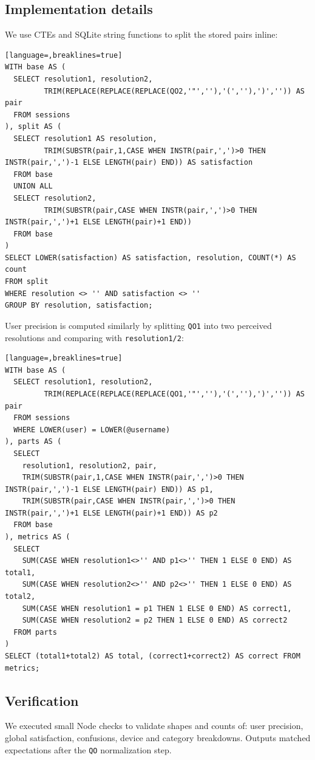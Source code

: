 \documentclass[11pt,a4paper]{article}
\begin{document}
\subsection{Implementation details}
We use CTEs and SQLite string functions to split the stored pairs inline:
\begin{lstlisting}[language=,breaklines=true]
WITH base AS (
  SELECT resolution1, resolution2,
         TRIM(REPLACE(REPLACE(REPLACE(QO2,'"',''),'(',''),')','')) AS pair
  FROM sessions
), split AS (
  SELECT resolution1 AS resolution,
         TRIM(SUBSTR(pair,1,CASE WHEN INSTR(pair,',')>0 THEN INSTR(pair,',')-1 ELSE LENGTH(pair) END)) AS satisfaction
  FROM base
  UNION ALL
  SELECT resolution2,
         TRIM(SUBSTR(pair,CASE WHEN INSTR(pair,',')>0 THEN INSTR(pair,',')+1 ELSE LENGTH(pair)+1 END))
  FROM base
)
SELECT LOWER(satisfaction) AS satisfaction, resolution, COUNT(*) AS count
FROM split
WHERE resolution <> '' AND satisfaction <> ''
GROUP BY resolution, satisfaction;
\end{lstlisting}

User precision is computed similarly by splitting \texttt{QO1} into two perceived resolutions and comparing with \texttt{resolution1/2}:
\begin{lstlisting}[language=,breaklines=true]
WITH base AS (
  SELECT resolution1, resolution2,
         TRIM(REPLACE(REPLACE(REPLACE(QO1,'"',''),'(',''),')','')) AS pair
  FROM sessions
  WHERE LOWER(user) = LOWER(@username)
), parts AS (
  SELECT
    resolution1, resolution2, pair,
    TRIM(SUBSTR(pair,1,CASE WHEN INSTR(pair,',')>0 THEN INSTR(pair,',')-1 ELSE LENGTH(pair) END)) AS p1,
    TRIM(SUBSTR(pair,CASE WHEN INSTR(pair,',')>0 THEN INSTR(pair,',')+1 ELSE LENGTH(pair)+1 END)) AS p2
  FROM base
), metrics AS (
  SELECT
    SUM(CASE WHEN resolution1<>'' AND p1<>'' THEN 1 ELSE 0 END) AS total1,
    SUM(CASE WHEN resolution2<>'' AND p2<>'' THEN 1 ELSE 0 END) AS total2,
    SUM(CASE WHEN resolution1 = p1 THEN 1 ELSE 0 END) AS correct1,
    SUM(CASE WHEN resolution2 = p2 THEN 1 ELSE 0 END) AS correct2
  FROM parts
)
SELECT (total1+total2) AS total, (correct1+correct2) AS correct FROM metrics;
\end{lstlisting}

\subsection{Verification}
We executed small Node checks to validate shapes and counts of: user precision, global satisfaction, confusions, device and category breakdowns. Outputs matched expectations after the \texttt{QO} normalization step.
\end{document}
